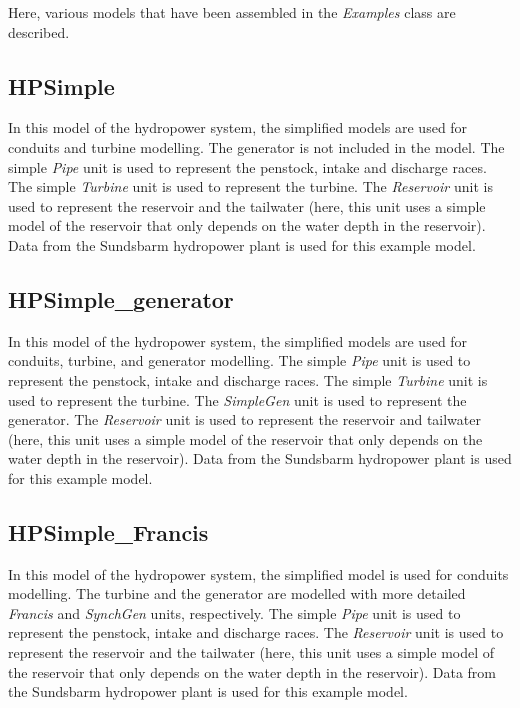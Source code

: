\documentclass[%
]{USN-PhD}
\begin{document}
Here, various models that have been assembled in the \emph{Examples} class are described.

\subsection{HPSimple}

In this model of the hydropower system, the simplified models are used for conduits and turbine modelling. The generator is not included in the model. The simple \emph{Pipe} unit is used to represent the penstock, intake and discharge races. The simple \emph{Turbine} unit is used to represent the turbine. The \emph{Reservoir} unit is used to represent the reservoir and the tailwater (here, this unit uses a simple model of the reservoir that only depends on the water depth in the reservoir). Data from the Sundsbarm hydropower plant is used for this example model.

\subsection{HPSimple\_generator}

In this model of the hydropower system, the simplified models are used for conduits, turbine, and generator modelling. The simple \emph{Pipe} unit is used to represent the penstock, intake and discharge races. The simple \emph{Turbine} unit is used to represent the turbine. The \emph{SimpleGen} unit is used to represent the generator. The \emph{Reservoir} unit is used to represent the reservoir and tailwater (here, this unit uses a simple model of the reservoir that only depends on the water depth in the reservoir). Data from the Sundsbarm hydropower plant is used for this example model.

\subsection{HPSimple\_Francis}

In this model of the hydropower system, the simplified model is used for conduits modelling. The turbine and the generator are modelled with more detailed \emph{Francis} and \emph{SynchGen} units, respectively. The simple \emph{Pipe} unit is used to represent the penstock, intake and discharge races. The \emph{Reservoir} unit is used to represent the reservoir and the tailwater (here, this unit uses a simple model of the reservoir that only depends on the water depth in the reservoir). Data from the Sundsbarm hydropower plant is used for this example model.
\end{document}
